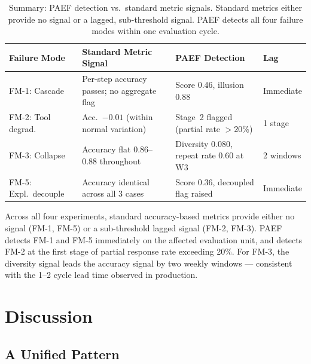 \documentclass{article}
\begin{document}
\begin{table}[t]
  \centering
  \caption{Summary: PAEF detection vs.\ standard metric signals.  Standard
    metrics either provide no signal or a lagged, sub-threshold signal.
    PAEF detects all four failure modes within one evaluation cycle.}
  \label{tab:exp-summary}
  \small
  \renewcommand{\arraystretch}{1.2}
  \setlength{\tabcolsep}{4pt}
  \begin{tabular}{p{3.0cm}p{4.2cm}p{4.0cm}p{1.5cm}}
    \toprule
    \textbf{Failure Mode} & \textbf{Standard Metric Signal} & \textbf{PAEF Detection} & \textbf{Lag} \\
    \midrule
    FM-1: Cascade    & Per-step accuracy passes; no aggregate flag    & Score 0.46, illusion 0.88                & Immediate \\
    FM-2: Tool degrad.& Acc.\ $-0.01$ (within normal variation)        & Stage~2 flagged (partial rate $>$20\%)   & 1 stage   \\
    FM-3: Collapse   & Accuracy flat 0.86--0.88 throughout            & Diversity 0.080, repeat rate 0.60 at W3  & 2 windows \\
    FM-5: Expl.\ decouple & Accuracy identical across all 3 cases    & Score 0.36, decoupled flag raised        & Immediate \\
    \bottomrule
  \end{tabular}
\end{table}

Across all four experiments, standard accuracy-based metrics provide either
no signal (FM-1, FM-5) or a sub-threshold lagged signal (FM-2, FM-3).
PAEF detects FM-1 and FM-5 immediately on the affected evaluation unit, and
detects FM-2 at the first stage of partial response rate exceeding 20\%.
For FM-3, the diversity signal leads the accuracy signal by two weekly
windows --- consistent with the 1--2 cycle lead time observed in production.

\section{Discussion}
\label{sec:discussion}

\subsection{A Unified Pattern}
\end{document}
